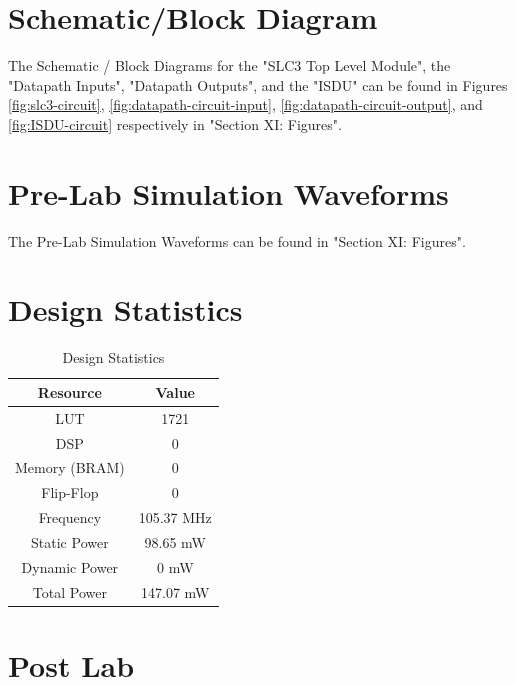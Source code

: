 \documentclass[journal, twocolumn, final,11pt,letterpaper]{IEEEtran}
\begin{document}
\section{Schematic/Block Diagram}
The Schematic / Block Diagrams for the "SLC3 Top Level Module", the "Datapath Inputs", "Datapath Outputs", and the "ISDU" can be found in Figures \ref{fig:slc3-circuit}, \ref{fig:datapath-circuit-input}, \ref{fig:datapath-circuit-output}, and \ref{fig:ISDU-circuit} respectively in "Section XI: Figures".

\section{Pre-Lab Simulation Waveforms}
The Pre-Lab Simulation Waveforms can be found in "Section XI: Figures".

\section{Design Statistics}
\begin{table}[htbp]
	\centering
	\begin{tabular}{c|c}	%
		\toprule	%
		Resource & Value \\
		\midrule
		LUT & 1721\\
		DSP & 0\\
		Memory (BRAM) & 0\\
		Flip-Flop & 0\\
		Frequency & 105.37 MHz\\
		Static Power & 98.65 mW\\
		Dynamic Power & 0 mW\\
		Total Power & 147.07 mW\\
		\bottomrule	%
	\end{tabular}%
	\caption{Design Statistics}
	\label{tab:table2}	%
\end{table}%

\section{Post Lab}


\end{document}
